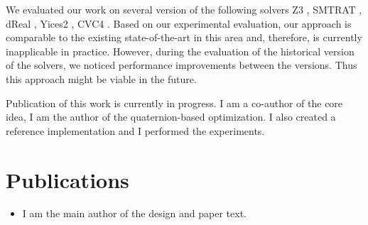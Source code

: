 We evaluated our work on several version of the following solvers Z3
\cite{DBLP:conf/tacas/MouraB08}, SMTRAT \cite{DBLP:conf/sat/CorziliusKJSA15},
dReal \cite{DBLP:conf/cade/GaoKC13}, Yices2 \cite{DBLP:conf/cav/Dutertre14},
CVC4 \cite{DBLP:conf/cav/BarrettCDHJKRT11}. Based on our experimental
evaluation, our approach is comparable to the existing state-of-the-art in this
area and, therefore, is currently inapplicable in practice. However, during the
evaluation of the historical version of the solvers, we noticed performance
improvements between the versions. Thus this approach might be viable in the
future.

Publication of this work is currently in progress. I am a co-author
of the core idea, I am the author of the quaternion-based optimization. I also
created a reference implementation and I performed the experiments.

\section{Publications}

\begin{itemize}

    \item {}

    I am the main author of the design and paper text.
\end{itemize}
